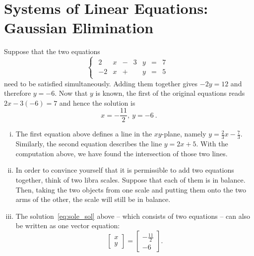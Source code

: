 \section{Systems of Linear Equations: Gaussian Elimination}
\label{sec:sys_lin_equ}
Suppose that the two equations
\begin{equation*}
\begin{cases}
\begin{array}{rcccccl}
2 & x & - & 3 & y & = & 7 \\
-2 & x & + & & y & = & 5
\end{array} \end{cases}
\end{equation*}
need to be satisfied simultaneously. Adding them together gives $-2y = 12$ and therefore $y = -6$. Now that $y$ is known, the first of the original equations reads $2x-3(-6) = 7$ and hence the solution is
\begin{equation}
\label{eq:sole_sol}
x = -\frac{11}{2}, \: y = -6 \:.
\end{equation}

\begin{remark}
\begin{enumerate}[(i)]
	\item The first equation above defines a line in the $xy$-plane, namely $y=\tfrac23x-\tfrac73$. Similarly, the second equation describes the line $y=2x+5$. With the computation above, we have found the intersection of those two lines.
	\item In order to convince yourself that it is permissible to add two equations together, think of two libra scales. Suppose that each of them is in balance. Then, taking the two objects from one scale and putting them onto the two arms of the other, the scale will still be in balance.
	\item The solution~\eqref{eq:sole_sol} above -- which consists of two equations -- can also be written as one vector equation:
	\[ \begin{bmatrix} x \\ y \end{bmatrix} 
	= \begin{bmatrix} -\tfrac{11}{2} \\ -6 \end{bmatrix}. \] 
\end{enumerate}
\end{remark}

